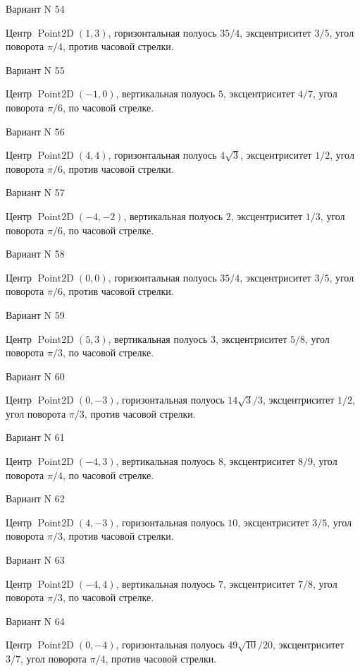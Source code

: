 \documentclass[11pt]{report}
\begin{document}
Вариант N 54

Центр $\operatorname{Point2D}\left(1, 3\right)$, горизонтальная полуось $35 / 4$, эксцентриситет $3 / 5$, угол поворота $\pi / 4$, против часовой стрелки.

Вариант N 55

Центр $\operatorname{Point2D}\left(-1, 0\right)$, вертикальная полуось $5$, эксцентриситет $4 / 7$, угол поворота $\pi / 6$, по часовой стрелке.

Вариант N 56

Центр $\operatorname{Point2D}\left(4, 4\right)$, горизонтальная полуось $4 \sqrt{3}$, эксцентриситет $1 / 2$, угол поворота $\pi / 6$, против часовой стрелки.

Вариант N 57

Центр $\operatorname{Point2D}\left(-4, -2\right)$, вертикальная полуось $2$, эксцентриситет $1 / 3$, угол поворота $\pi / 6$, по часовой стрелке.

Вариант N 58

Центр $\operatorname{Point2D}\left(0, 0\right)$, горизонтальная полуось $35 / 4$, эксцентриситет $3 / 5$, угол поворота $\pi / 6$, против часовой стрелки.

Вариант N 59

Центр $\operatorname{Point2D}\left(5, 3\right)$, вертикальная полуось $3$, эксцентриситет $5 / 8$, угол поворота $\pi / 3$, по часовой стрелке.

Вариант N 60

Центр $\operatorname{Point2D}\left(0, -3\right)$, горизонтальная полуось $14 \sqrt{3} / 3$, эксцентриситет $1 / 2$, угол поворота $\pi / 3$, против часовой стрелки.

Вариант N 61

Центр $\operatorname{Point2D}\left(-4, 3\right)$, вертикальная полуось $8$, эксцентриситет $8 / 9$, угол поворота $\pi / 4$, по часовой стрелке.

Вариант N 62

Центр $\operatorname{Point2D}\left(4, -3\right)$, горизонтальная полуось $10$, эксцентриситет $3 / 5$, угол поворота $\pi / 3$, против часовой стрелки.

Вариант N 63

Центр $\operatorname{Point2D}\left(-4, 4\right)$, вертикальная полуось $7$, эксцентриситет $7 / 8$, угол поворота $\pi / 3$, по часовой стрелке.

Вариант N 64

Центр $\operatorname{Point2D}\left(0, -4\right)$, горизонтальная полуось $49 \sqrt{10} / 20$, эксцентриситет $3 / 7$, угол поворота $\pi / 4$, против часовой стрелки.
\end{document}
